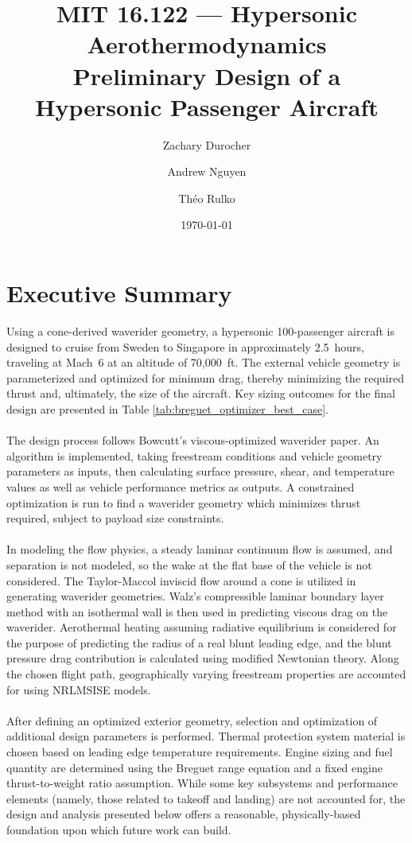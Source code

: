\documentclass[10pt,a4paper]{article}
\title{\sffamily\textbf{\normalsize MIT 16.122 --- Hypersonic Aerothermodynamics}\\ Preliminary Design of a Hypersonic Passenger Aircraft}
\date{\sffamily\today}
\author[1,3,4]{Zachary Durocher}
\author[1,3,4]{Andrew Nguyen}
\author[1,2]{Th\'eo Rulko}
\affil[1]{Department of Aeronautics \& Astronautics, Massachusetts Institute of Technology}
\affil[2]{MIT-NNSA Center for the Exascale Simulation of High-Enthalpy Fluid-Solid Interactions (CHEFSI)}
\affil[3]{MIT Hypersonics Research Laboratory (HRL)}
\affil[4]{United States Air Force}
\begin{document}
\allsectionsfont{\sffamily}
\maketitle%

\section*{\large Executive Summary}
Using a cone-derived waverider geometry, a hypersonic 100-passenger aircraft is designed to cruise from Sweden to Singapore in approximately 2.5~hours, traveling at Mach~6 at an altitude of 70,000~ft. The external vehicle geometry is parameterized and optimized for minimum drag, thereby minimizing the required thrust and, ultimately, the size of the aircraft. Key sizing outcomes for the final design are presented in Table \ref{tab:breguet_optimizer_best_case}. 
\\\\
The design process follows Bowcutt's \citep{Bowcutt:1986,Bowcutt:1987} viscous-optimized waverider paper. An algorithm is implemented, taking freestream conditions and vehicle geometry parameters as inputs, then calculating surface pressure, shear, and temperature values as well as vehicle performance metrics as outputs. A constrained optimization is run to find a waverider geometry which minimizes thrust required, subject to payload size constraints.
\\\\
In modeling the flow physics, a steady laminar continuum flow is assumed, and separation is not modeled, so the wake at the flat base of the vehicle is not considered. The Taylor-Maccol inviscid flow around a cone is utilized in generating waverider geometries. Walz's compressible laminar boundary layer method with an isothermal wall is then used in predicting viscous drag on the waverider. Aerothermal heating assuming radiative equilibrium is considered for the purpose of predicting the radius of a real blunt leading edge, and the blunt pressure drag contribution is calculated using modified Newtonian theory. Along the chosen flight path, geographically varying freestream properties are accounted for using NRLMSISE models.
\\\\
After defining an optimized exterior geometry, selection and optimization of additional design parameters is performed. Thermal protection system material is chosen based on leading edge temperature requirements. Engine sizing and fuel quantity are determined using the Breguet range equation and a fixed engine thrust-to-weight ratio assumption. While some key subsystems and performance elements (namely, those related to takeoff and landing) are not accounted for, the design and analysis presented below offers a reasonable, physically-based foundation upon which future work can build.
\end{document}
